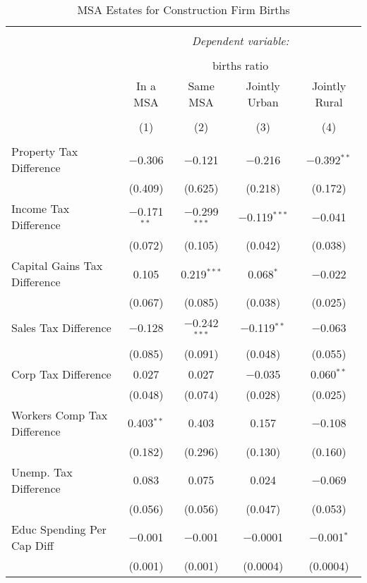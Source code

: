 
\begin{table}[!htbp] \centering 
  \caption{MSA Estates for  Construction Firm Births} 
  \label{} 
\begin{tabular}{@{\extracolsep{5pt}}lcccc} 
\\[-1.8ex]\hline 
\hline \\[-1.8ex] 
 & \multicolumn{4}{c}{\textit{Dependent variable:}} \\ 
\cline{2-5} 
\\[-1.8ex] & \multicolumn{4}{c}{births ratio} \\ 
 & In a MSA & Same MSA & Jointly Urban & Jointly Rural \\ 
\\[-1.8ex] & (1) & (2) & (3) & (4)\\ 
\hline \\[-1.8ex] 
 Property Tax Difference & $-$0.306 & $-$0.121 & $-$0.216 & $-$0.392$^{**}$ \\ 
  & (0.409) & (0.625) & (0.218) & (0.172) \\ 
  Income Tax Difference & $-$0.171$^{**}$ & $-$0.299$^{***}$ & $-$0.119$^{***}$ & $-$0.041 \\ 
  & (0.072) & (0.105) & (0.042) & (0.038) \\ 
  Capital Gains Tax Difference & 0.105 & 0.219$^{***}$ & 0.068$^{*}$ & $-$0.022 \\ 
  & (0.067) & (0.085) & (0.038) & (0.025) \\ 
  Sales Tax Difference & $-$0.128 & $-$0.242$^{***}$ & $-$0.119$^{**}$ & $-$0.063 \\ 
  & (0.085) & (0.091) & (0.048) & (0.055) \\ 
  Corp Tax Difference & 0.027 & 0.027 & $-$0.035 & 0.060$^{**}$ \\ 
  & (0.048) & (0.074) & (0.028) & (0.025) \\ 
  Workers Comp Tax Difference & 0.403$^{**}$ & 0.403 & 0.157 & $-$0.108 \\ 
  & (0.182) & (0.296) & (0.130) & (0.160) \\ 
  Unemp. Tax Difference & 0.083 & 0.075 & 0.024 & $-$0.069 \\ 
  & (0.056) & (0.056) & (0.047) & (0.053) \\ 
  Educ Spending Per Cap Diff & $-$0.001 & $-$0.001 & $-$0.0001 & $-$0.001$^{*}$ \\ 
  & (0.001) & (0.001) & (0.0004) & (0.0004) \\ 

\end{tabular}
\end{table}

